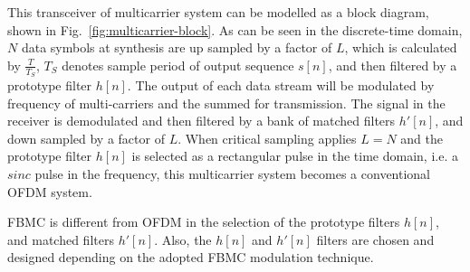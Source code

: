 This transceiver of multicarrier system can be modelled as a block diagram, shown in Fig.~\ref{fig:multicarrier-block}.
As can be seen in the discrete-time domain, $N$ data symbols at synthesis are up sampled by a factor of $L$, which is calculated by $\frac{T}{T_{S}}$, $T_{S}$ denotes sample period of output sequence $s[n]$, and then filtered by a prototype filter $h[n]$. The output of each data stream will be modulated by frequency of multi-carriers and the summed for transmission. 
The signal in the receiver is demodulated and then filtered by a bank of matched filters $h'[n]$, and down sampled by a factor of $L$. 
When critical sampling applies $L = N$ and the prototype filter $h[n]$ is selected as a rectangular pulse in the time domain, i.e. a $sinc$ pulse in the frequency, this multicarrier system becomes a conventional OFDM system.
 
FBMC is different from OFDM in the selection of the prototype filters $h[n]$, and matched filters $h'[n]$. Also, the $h[n]$ and $h'[n]$ filters are chosen and designed depending on the adopted FBMC modulation technique.

